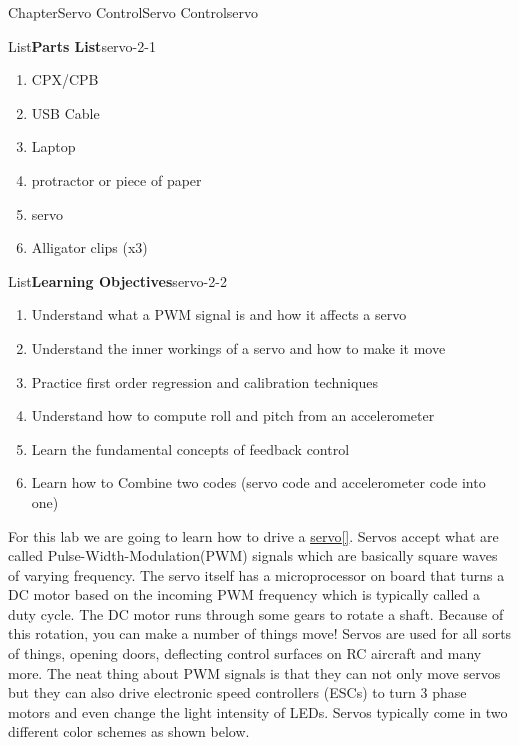 \documentclass[oneside,10pt,]{book}
\newcommand{\xreffont}{\relax}
\newcommand{\linkhilite}[1]{\underline{#1}}
\numberwithin{equation}{section}
\begin{document}
%
%
\typeout{************************************************}
\typeout{************************************************}
%
\begin{chapterptx}{Chapter}{Servo Control}{}{Servo Control}{}{}{servo}
\renewcommand*{\chaptername}{Chapter}
\begin{introduction}{}%
\begin{listptx}{List}{\textbf{Parts List}}{servo-2-1}{}%
%
\begin{enumerate}
\item{}CPX\slash{}CPB%
\item{}USB Cable%
\item{}Laptop%
\item{}protractor or piece of paper%
\item{}servo%
\item{}Alligator clips (x3)%
\end{enumerate}
\end{listptx}%
\begin{listptx}{List}{\textbf{Learning Objectives}}{servo-2-2}{}%
%
\begin{enumerate}
\item{}Understand what a PWM signal is and how it affects a servo%
\item{}Understand the inner workings of a servo and how to make it move%
\item{}Practice first order regression and calibration techniques%
\item{}Understand how to compute roll and pitch from an accelerometer%
\item{}Learn the fundamental concepts of feedback control%
\item{}Learn how to Combine two codes (servo code and accelerometer code into one)%
\end{enumerate}
\end{listptx}%
For this lab we are going to learn how to drive a \href{https://www.adafruit.com/product/1143}{\linkhilite{servo}}\hyperlink{AdafruitMAIN}{\linkhilite{[{\xreffont 34}]}}. Servos accept what are called Pulse-Width-Modulation(PWM) signals which are basically square waves of varying frequency. The servo itself has a microprocessor on board that turns a DC motor based on the incoming PWM frequency which is typically called a duty cycle. The DC motor runs through some gears to rotate a shaft. Because of this rotation, you can make a number of things move! Servos are used for all sorts of things, opening doors, deflecting control surfaces on RC aircraft and many more. The neat thing about PWM signals is that they can not only move servos but they can also drive electronic speed controllers (ESCs) to turn 3 phase motors and even change the light intensity of LEDs. Servos typically come in two different color schemes as shown below.%

\end{introduction}
\end{chapterptx}
\end{document}

